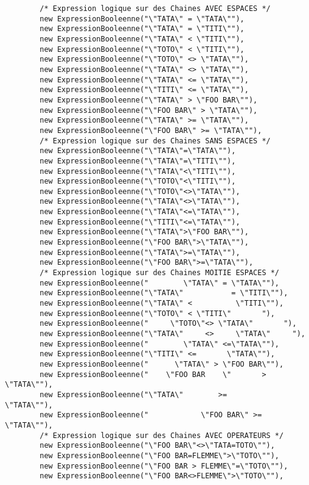 \begin{enum}
\begin{verbatim}
        /* Expression logique sur des Chaines AVEC ESPACES */
        new ExpressionBooleenne("\"TATA\" = \"TATA\""),
        new ExpressionBooleenne("\"TATA\" = \"TITI\""),
        new ExpressionBooleenne("\"TATA\" < \"TITI\""),
        new ExpressionBooleenne("\"TOTO\" < \"TITI\""),
        new ExpressionBooleenne("\"TOTO\" <> \"TATA\""),
        new ExpressionBooleenne("\"TATA\" <> \"TATA\""),
        new ExpressionBooleenne("\"TATA\" <= \"TATA\""),
        new ExpressionBooleenne("\"TITI\" <= \"TATA\""),
        new ExpressionBooleenne("\"TATA\" > \"FOO BAR\""),
        new ExpressionBooleenne("\"FOO BAR\" > \"TATA\""),
        new ExpressionBooleenne("\"TATA\" >= \"TATA\""),
        new ExpressionBooleenne("\"FOO BAR\" >= \"TATA\""),
        /* Expression logique sur des Chaines SANS ESPACES */
        new ExpressionBooleenne("\"TATA\"=\"TATA\""),
        new ExpressionBooleenne("\"TATA\"=\"TITI\""),
        new ExpressionBooleenne("\"TATA\"<\"TITI\""),
        new ExpressionBooleenne("\"TOTO\"<\"TITI\""),
        new ExpressionBooleenne("\"TOTO\"<>\"TATA\""),
        new ExpressionBooleenne("\"TATA\"<>\"TATA\""),
        new ExpressionBooleenne("\"TATA\"<=\"TATA\""),
        new ExpressionBooleenne("\"TITI\"<=\"TATA\""),
        new ExpressionBooleenne("\"TATA\">\"FOO BAR\""),
        new ExpressionBooleenne("\"FOO BAR\">\"TATA\""),
        new ExpressionBooleenne("\"TATA\">=\"TATA\""),
        new ExpressionBooleenne("\"FOO BAR\">=\"TATA\""),
        /* Expression logique sur des Chaines MOITIE ESPACES */
        new ExpressionBooleenne("        \"TATA\" = \"TATA\""),
        new ExpressionBooleenne("\"TATA\"           = \"TITI\""),
        new ExpressionBooleenne("\"TATA\" <          \"TITI\""),
        new ExpressionBooleenne("\"TOTO\" < \"TITI\"       "),
        new ExpressionBooleenne("     \"TOTO\"<> \"TATA\"       "),
        new ExpressionBooleenne("\"TATA\"     <>     \"TATA\"     "),
        new ExpressionBooleenne("        \"TATA\" <=\"TATA\""),
        new ExpressionBooleenne("\"TITI\" <=       \"TATA\""),
        new ExpressionBooleenne("      \"TATA\" > \"FOO BAR\""),
        new ExpressionBooleenne("    \"FOO BAR    \"       > \"TATA\""),
        new ExpressionBooleenne("\"TATA\"        >=         \"TATA\""),
        new ExpressionBooleenne("            \"FOO BAR\" >=      \"TATA\""),
        /* Expression logique sur des Chaines AVEC OPERATEURS */
        new ExpressionBooleenne("\"FOO BAR\"<>\"TATA=TOTO\""),
        new ExpressionBooleenne("\"FOO BAR=FLEMME\">\"TOTO\""),
        new ExpressionBooleenne("\"FOO BAR > FLEMME\"=\"TOTO\""),
        new ExpressionBooleenne("\"FOO BAR<>FLEMME\">\"TOTO\""),
        

\end{verbatim}
\end{enum}
